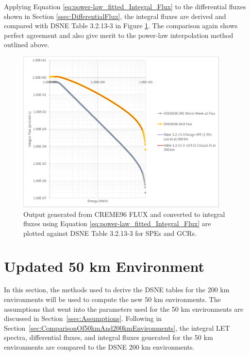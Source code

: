 \documentclass{hitec}
\begin{document}
Applying Equation \eqref{eq:power-law_fitted_Integral_Flux} to the differential fluxes shown in Section \ref{ssec:DifferentialFlux}, the integral fluxes are derived and compared with DSNE Table 3.2.13-3 in Figure \ref{fig:DSNE_Integral_Flux_Comparison}. The comparison again shows perfect agreement and also give merit to the power-law interpolation method outlined above.

\begin{figure}[htbp!]
	\centering
	\includegraphics[width=0.95\textwidth]{DSNE_Integral_Flux_Comparison.png}
	\caption{Output generated from CREME96 \textsf{FLUX} and converted to integral fluxes using Equation \eqref{eq:power-law_fitted_Integral_Flux} are plotted against DSNE Table 3.2.13-3 for SPEs and GCRs.}\label{fig:DSNE_Integral_Flux_Comparison}
\end{figure}



\clearpage %


\section{Updated 50 km Environment}

In this section, the methods used to derive the DSNE tables for the 200 km environments will be used to compute the new 50 km environments. The assumptions that went into the parameters used for the 50 km environments are discussed in Section~\ref{ssec:Assumptions}. Following in Section~\ref{sec:ComparisonOf50kmAnd200kmEnvironments}, the integral LET spectra, differential fluxes, and integral fluxes generated for the 50 km environments are compared to the DSNE 200 km environments.
\end{document}
